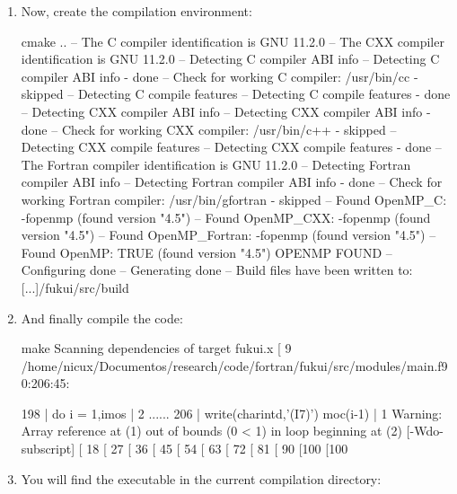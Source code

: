 \documentclass[a4paper,11pt,openany]{memoir}
\begin{document}
\begin{enumerate}
	\item Now, create the compilation environment:
		\begin{consola}{cmake ..}
-- The C compiler identification is GNU 11.2.0
-- The CXX compiler identification is GNU 11.2.0
-- Detecting C compiler ABI info
-- Detecting C compiler ABI info - done
-- Check for working C compiler: /usr/bin/cc - skipped
-- Detecting C compile features
-- Detecting C compile features - done
-- Detecting CXX compiler ABI info
-- Detecting CXX compiler ABI info - done
-- Check for working CXX compiler: /usr/bin/c++ - skipped
-- Detecting CXX compile features
-- Detecting CXX compile features - done
-- The Fortran compiler identification is GNU 11.2.0
-- Detecting Fortran compiler ABI info
-- Detecting Fortran compiler ABI info - done
-- Check for working Fortran compiler: /usr/bin/gfortran - skipped
-- Found OpenMP_C: -fopenmp (found version "4.5") 
-- Found OpenMP_CXX: -fopenmp (found version "4.5") 
-- Found OpenMP_Fortran: -fopenmp (found version "4.5") 
-- Found OpenMP: TRUE (found version "4.5")  
OPENMP FOUND
-- Configuring done
-- Generating done
-- Build files have been written to: [...]/fukui/src/build
\end{consola}
	\item And finally compile the code:
		\begin{consola}{make}
Scanning dependencies of target fukui.x
[  9%
/home/nicux/Documentos/research/code/fortran/fukui/src/modules/main.f90:206:45:

198 |       do i = 1,imos
|                   2                          
......
206 |                   write(charintd,'(I7)') moc(i-1)
|                                             1
Warning: Array reference at (1) out of bounds (0 < 1) in loop beginning at (2) [-Wdo-subscript]
[ 18%
[ 27%
[ 36%
[ 45%
[ 54%
[ 63%
[ 72%
[ 81%
[ 90%
[100%
[100%
\end{consola}
	\item You will find the executable in the current compilation directory:


\end{enumerate}
\end{document}

